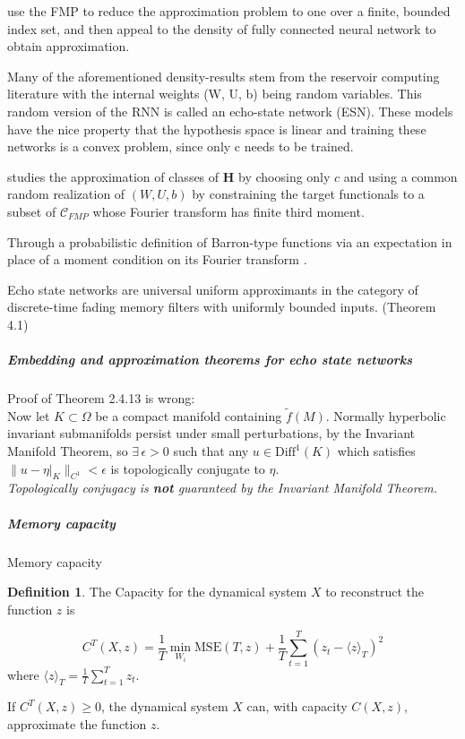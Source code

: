 \documentclass{article}
\theoremstyle{definition}
\newtheorem{definition}{Definition}
\theoremstyle{remark}
\begin{document}
\citet{gonon2021fading} use the FMP to reduce the approximation problem to one over a finite, bounded index set, and then appeal to the density of fully connected neural network to obtain approximation.

Many of the aforementioned density-results stem from the reservoir computing literature with the internal weights (W, U, b) being random variables. 
This random version of the RNN is called an echo-state network (ESN).
These models have the nice property that the hypothesis space is linear and training these networks is a convex problem, since only c needs to be trained.

\citet{gonon2023approximation} studies the approximation of classes of $\mathbf{H}$ by choosing only $c$ and using a common random realization of $(W, U, b)$ by constraining the target functionals to a subset of $\mathcal{C}_{FMP}$ whose Fourier transform has finite third moment.

Through a probabilistic definition of Barron-type functions \citep{barron1992neural} via an expectation in place of a moment condition on its Fourier transform \citep{ma2018priori,ma2020towards,weinan2020banach}.

Echo state networks are universal uniform approximants in the category of discrete-time fading memory filters with uniformly bounded inputs\citep{grigoryeva2018universal}. (Theorem 4.1)


\subparagraph{Embedding and approximation theorems for echo state networks}
\citep{hart2020embedding}
Proof of Theorem 2.4.13 is wrong: \\
Now let \( K \subset \Omega \) be a compact manifold containing \( \tilde{f}(M) \). Normally hyperbolic invariant submanifolds persist under small perturbations, by the Invariant Manifold Theorem, so \( \exists \, \epsilon > 0 \) such that any \( u \in \text{Diff}^1(K) \) which satisfies \( \| u - \eta|_K \|_{C^1} < \epsilon \) is topologically conjugate to \( \eta \).\\
\emph{Topologically conjugacy is \textbf{not} guaranteed by the Invariant Manifold Theorem.}



\subparagraph{Memory capacity}
Memory capacity \citep{dambre2012}
\begin{definition}
The Capacity for the dynamical system \( X \) to reconstruct the function \( z \) is

\[
C^T(X, z) = \frac{1}{T} \min_{W_i} \text{MSE}(T, z) + \frac{1}{T} \sum_{t=1}^{T} \left( z_t - \langle z \rangle_T \right)^2
\tag{5}
\]
where \( \langle z \rangle_T = \frac{1}{T} \sum_{t=1}^{T} z_t \).

If \( C^T(X, z) \geq 0 \), the dynamical system \( X \) can, with capacity \( C(X, z) \), approximate the function \( z \).
\end{definition}
\end{document}
